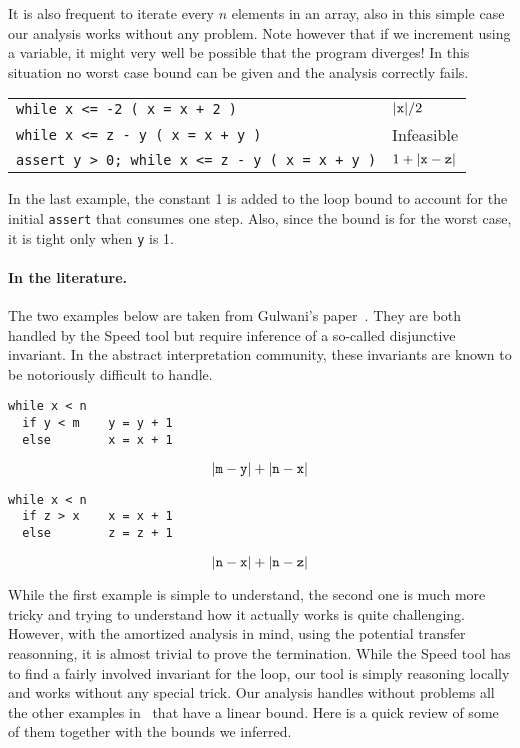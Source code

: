 \documentclass[10pt]{article}
\begin{document}
It is also frequent to iterate every $n$ elements in an array, also
in this simple case our analysis works without any problem.  Note
however that if we increment using a variable, it might very well be
possible that the program diverges!  In this situation no worst
case bound can be given and the analysis correctly fails.
\begin{center}
\begin{tabular}{p{} | p{} }
\lstinline|while x <= -2 ( x = x + 2 )| & $| {\tt x} | / 2$ \\
\lstinline|while x <= z - y ( x = x + y )| & Infeasible \\
\lstinline|assert y > 0; while x <= z - y ( x = x + y )| & $1 + |{\tt x} - {\tt z}|$
\end{tabular}
\end{center}
In the last example, the constant 1 is added to the loop bound
to account for the initial \texttt{assert} that consumes one
step.  Also, since the bound is for the worst case, it is tight
only when {\tt y} is 1.

\paragraph{In the literature.}
The two examples below are taken from Gulwani's paper~\cite{Gulwani-speed}.
They are both handled by the Speed tool but require inference of a so-called
disjunctive invariant.  In the abstract interpretation community, these
invariants are known to be notoriously difficult to handle.

\begin{minipage}{0.45\textwidth}
\begin{lstlisting}
while x < n
  if y < m    y = y + 1
  else        x = x + 1
\end{lstlisting}
$$
|{\tt m} - {\tt y}| + |{\tt n} - {\tt x}|
$$
\end{minipage}
\begin{minipage}{0.45\textwidth}
\begin{lstlisting}
while x < n
  if z > x    x = x + 1
  else        z = z + 1
\end{lstlisting}
$$
|{\tt n} - {\tt x}| + |{\tt n} - {\tt z}|
$$
\end{minipage}

\hspace{1ex}

While the first
example is simple to understand, the second one is much more
tricky and trying to understand how it actually works is quite challenging.
However, with the amortized analysis in mind, using the potential transfer
reasonning, it is almost trivial to prove the termination.  While the Speed
tool has to find a fairly involved invariant for the loop, our tool is simply
reasoning locally and works without any special trick.
%
Our analysis handles without problems all the other examples
in~\cite{Gulwani-speed} that have a linear bound.  Here is
a quick review of some of them together with the bounds we
inferred.
\end{document}

